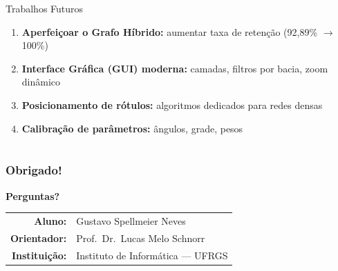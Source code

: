 \documentclass{beamer}
\begin{document}
\begin{frame}{Trabalhos Futuros}
  \begin{enumerate}
    \item \textbf{Aperfeiçoar o Grafo Híbrido:} aumentar taxa de retenção (92,89\% $\to$ 100\%)
    \item \textbf{Interface Gráfica (GUI) moderna:} camadas, filtros por bacia, zoom dinâmico
    \item \textbf{Posicionamento de rótulos:} algoritmos dedicados para redes densas
    \item \textbf{Calibração de parâmetros:} ângulos, grade, pesos
  \end{enumerate}
\end{frame}

\section*{}

\begin{frame}
  \frametitle{Obrigado!}

  \vspace{0.5cm}
  \centering
  {\Large\bfseries Perguntas?}

  \vspace{1cm}
  \begin{tabular}{rl}
    \textbf{Aluno:} & Gustavo Spellmeier Neves \\
    \textbf{Orientador:} & Prof.~Dr.~Lucas Melo Schnorr \\
    \textbf{Instituição:} & Instituto de Informática --- UFRGS \\
  \end{tabular}

  \vspace{0.8cm}
  \InfContacts
\end{frame}
\end{document}
